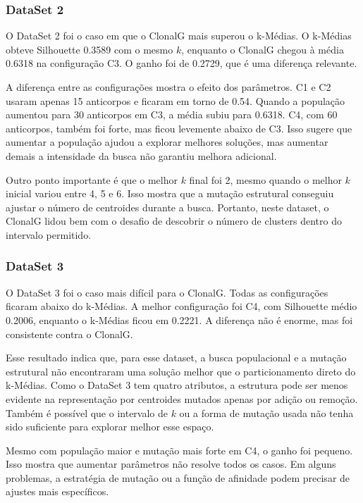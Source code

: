 \documentclass[12pt,a4paper]{article}
\begin{document}
\subsubsection*{DataSet 2}

O DataSet 2 foi o caso em que o ClonalG mais superou o k-Médias. O k-Médias obteve Silhouette 0.3589 com o mesmo \(k\), enquanto o ClonalG chegou à média 0.6318 na configuração C3. O ganho foi de 0.2729, que é uma diferença relevante.

A diferença entre as configurações mostra o efeito dos parâmetros. C1 e C2 usaram apenas 15 anticorpos e ficaram em torno de 0.54. Quando a população aumentou para 30 anticorpos em C3, a média subiu para 0.6318. C4, com 60 anticorpos, também foi forte, mas ficou levemente abaixo de C3. Isso sugere que aumentar a população ajudou a explorar melhores soluções, mas aumentar demais a intensidade da busca não garantiu melhora adicional.

Outro ponto importante é que o melhor \(k\) final foi 2, mesmo quando o melhor \(k\) inicial variou entre 4, 5 e 6. Isso mostra que a mutação estrutural conseguiu ajustar o número de centroides durante a busca. Portanto, neste dataset, o ClonalG lidou bem com o desafio de descobrir o número de clusters dentro do intervalo permitido.

\subsubsection*{DataSet 3}

O DataSet 3 foi o caso mais difícil para o ClonalG. Todas as configurações ficaram abaixo do k-Médias. A melhor configuração foi C4, com Silhouette médio 0.2006, enquanto o k-Médias ficou em 0.2221. A diferença não é enorme, mas foi consistente contra o ClonalG.

Esse resultado indica que, para esse dataset, a busca populacional e a mutação estrutural não encontraram uma solução melhor que o particionamento direto do k-Médias. Como o DataSet 3 tem quatro atributos, a estrutura pode ser menos evidente na representação por centroides mutados apenas por adição ou remoção. Também é possível que o intervalo de \(k\) ou a forma de mutação usada não tenha sido suficiente para explorar melhor esse espaço.

Mesmo com população maior e mutação mais forte em C4, o ganho foi pequeno. Isso mostra que aumentar parâmetros não resolve todos os casos. Em alguns problemas, a estratégia de mutação ou a função de afinidade podem precisar de ajustes mais específicos.
\end{document}
